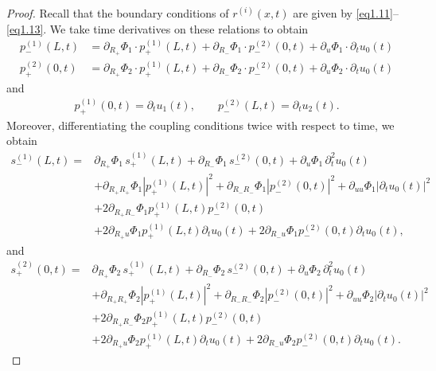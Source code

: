 \documentclass[10pt,a4paper]{amsart}
\begin{document}
\begin{proof}
Recall that the boundary conditions of $r^{(i)}(x,t)$ are given by \eqref{eq1.11}--\eqref{eq1.13}. We take time derivatives on these relations to obtain
\begin{align}
    p_-^{(1)}(L,t)&=\partial_{R_+}\Phi_1\cdot p_+^{(1)}(L,t) + \partial_{R_-}\Phi_1\cdot p_-^{(2)}(0,t)  +\partial_{u}\Phi_1\cdot \partial_tu_0(t)\label{eq-p1}\\[2mm]
    p_+^{(2)}(0,t)&=\partial_{R_+}\Phi_2\cdot p_+^{(1)}(L,t) + \partial_{R_-}\Phi_2\cdot p_-^{(2)}(0,t)  +\partial_{u}\Phi_2\cdot \partial_tu_0(t)\label{eq-p2}
\end{align}
and
\begin{align}
    p_+^{(1)}(0,t)=\partial_tu_1(t),\qquad
    p_-^{(2)}(L,t)=\partial_tu_2(t).
\end{align}
Moreover, differentiating the coupling conditions twice with
respect to time, we obtain
\begin{align}
s_-^{(1)}(L,t)
={}&
\partial_{R_+}\Phi_1\,s_+^{(1)}(L,t)
+\partial_{R_-}\Phi_1\,s_-^{(2)}(0,t)
+\partial_u\Phi_1\,\partial_t^2u_0(t)
\nonumber\\
&+
\partial_{R_+R_+}\Phi_1
\left|p_+^{(1)}(L,t)\right|^2
+
\partial_{R_-R_-}\Phi_1
\left|p_-^{(2)}(0,t)\right|^2
+
\partial_{uu}\Phi_1
\left|\partial_tu_0(t)\right|^2
\nonumber\\
&+
2\partial_{R_+R_-}\Phi_1
p_+^{(1)}(L,t)p_-^{(2)}(0,t)
\nonumber\\
&+
2\partial_{R_+u}\Phi_1
p_+^{(1)}(L,t)\partial_tu_0(t)
+
2\partial_{R_-u}\Phi_1
p_-^{(2)}(0,t)\partial_tu_0(t),
\label{eq-s1}
\end{align}
and
\begin{align}
s_+^{(2)}(0,t)
={}&
\partial_{R_+}\Phi_2\,s_+^{(1)}(L,t)
+\partial_{R_-}\Phi_2\,s_-^{(2)}(0,t)
+\partial_u\Phi_2\,\partial_t^2u_0(t)
\nonumber\\
&+
\partial_{R_+R_+}\Phi_2
\left|p_+^{(1)}(L,t)\right|^2
+
\partial_{R_-R_-}\Phi_2
\left|p_-^{(2)}(0,t)\right|^2
+
\partial_{uu}\Phi_2
\left|\partial_tu_0(t)\right|^2
\nonumber\\
&+
2\partial_{R_+R_-}\Phi_2
p_+^{(1)}(L,t)p_-^{(2)}(0,t)
\nonumber\\
&+
2\partial_{R_+u}\Phi_2
p_+^{(1)}(L,t)\partial_tu_0(t)
+
2\partial_{R_-u}\Phi_2
p_-^{(2)}(0,t)\partial_tu_0(t).
\label{eq-s2}
\end{align}

\end{proof}
\end{document}
